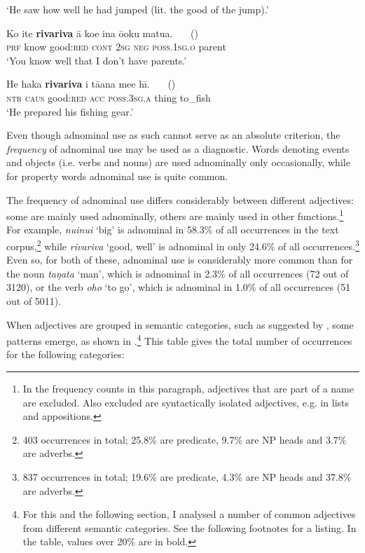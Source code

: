 \glt 
‘He saw how well he had jumped (lit. the good of the jump).’ \textstyleExampleref{[R408.025]} 
\z

\ea\label{ex:3.95}
\gll Ko {\ꞌ}ite \textbf{rivariva} {\ꞌ}ā koe {\ꞌ}ina ō{\ꞌ}oku matu{\ꞌ}a. ~~~\textup{()}\\
\textsc{prf} know good:\textsc{red} \textsc{cont} \textsc{2sg} \textsc{neg} \textsc{poss.1sg.o} parent \\

\glt 
‘You know well that I don’t have parents.’ \textstyleExampleref{[R214.013]} 
\z

\ea\label{ex:3.96}
\gll He haka \textbf{rivariva} i tā{\ꞌ}ana me{\ꞌ}e h{\=\i.} ~~~\textup{()}\\
\textsc{ntr} \textsc{caus} good:\textsc{red} \textsc{acc} \textsc{poss.3sg.a} thing to\_fish \\

\glt 
‘He prepared his fishing gear.’ \textstyleExampleref{[R237.111]} 
\z

Even though adnominal use as such cannot serve as an absolute criterion, the \textit{frequency} of adnominal use may be used as a diagnostic. Words denoting events and objects (i.e. verbs and nouns) are used adnominally only occasionally, while for property words adnominal use is quite common. 

The frequency of adnominal use differs considerably between different adjectives: some are mainly used adnominally, others are mainly used in other functions.\footnote{\label{fn:122}In the frequency counts in this paragraph, adjectives that are part of a name are excluded. Also excluded are syntactically isolated adjectives, e.g. in lists and appositions.} For example, \textit{nuinui} ‘big’ is adnominal in 58.3\% of all occurrences in the text corpus,\footnote{\label{fn:123}403 occurrences in total; 25.8\% are predicate, 9.7\% are NP heads and 3.7\% are adverbs.} while \textit{rivariva} ‘good, well’ is adnominal in only 24.6\% of all occurrences.\footnote{\label{fn:124}837 occurrences in total; 19.6\% are predicate, 4.3\% are NP heads and 37.8\% are adverbs.} Even so, for both of these, adnominal use is considerably more common than for the noun \textit{taŋata} ‘man’, which is adnominal in 2.3\% of all occurrences (72 out of 3120), or the verb \textit{oho} ‘to go’, which is adnominal in 1.0\% of all occurrences (51 out of 5011).

When adjectives are grouped in semantic categories, such as suggested by \citet[73]{Dixon2010-2}, some patterns emerge, as shown in .\footnote{\label{fn:125}For this and the following section, I analysed a number of common adjectives from different semantic categories. See the following footnotes for a listing. In the table, values over 20\% are in bold.} This table gives the total number of occurrences for the following categories:

